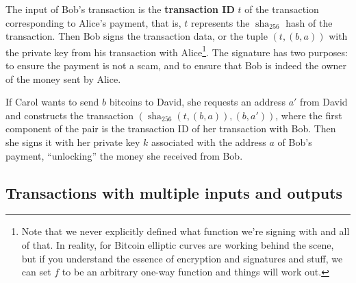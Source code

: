     The input of Bob's transaction is the \textbf{transaction ID} $t$ of the transaction corresponding to Alice's payment, that is, $t$ represents the $\operatorname{sha}_{256}$ hash of the transaction. Then Bob signs the transaction data, or the tuple $(t,(b,a))$ with the private key from his transaction with Alice\footnote{Note that we never explicitly defined what function we're signing with and all of that. In reality, for Bitcoin elliptic curves are working behind the scene, but if you understand the essence of encryption and signatures and stuff, we can set $f$ to be an arbitrary one-way function and things will work out.}. The signature has two purposes: to ensure the payment is not a scam, and to ensure that Bob is indeed the owner of the money sent by Alice.

    If Carol wants to send $b$ bitcoins to David, she requests an address $a'$ from David and constructs the transaction $(\operatorname{sha}_{256}(t,(b,a)),(b,a'))$, where the first component of the pair is the transaction ID of her transaction with Bob. Then she signs it with her private key $k$ associated with the address $a$ of Bob's payment, ``unlocking'' the money she received from Bob.

    \subsection*{Transactions with multiple inputs and outputs}
    
